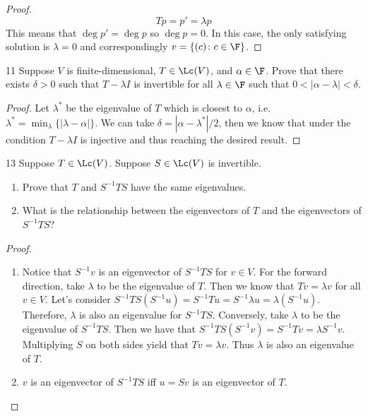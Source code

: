 \documentclass{extarticle}
\begin{document}
\begin{proof}
\[Tp = p' = \lambda p\]
This means that \(\deg p' = \deg p\) so \(\deg p = 0\). In this case, the only satisfying 
solution is \(\lambda = 0\) and correspondingly \(v = \{(c) \colon c \in \F\}\).
\end{proof}

\begin{problem}{11}
    Suppose \(V\) is finite-dimensional, \(T \in \Lc(V)\), and \(\alpha \in \F\). Prove that 
    there exists \(\delta > 0\) such that \(T - \lambda I\) is invertible for all \(\lambda \in \F\)
    such that \(0 < |\alpha - \lambda| < \delta\).
\end{problem}

\begin{proof}
Let \(\lambda^*\) be the eigenvalue of \(T\) which is closest to \(\alpha\), i.e. \(\lambda^* = \min_\lambda\{
    |\lambda - \alpha|\}\). We can take \(\delta = |\alpha - \lambda^*|/2\), then we know that 
    under the condition \(T - \lambda I\) is injective and thus reaching the desired result. 
\end{proof}

\begin{problem}{13}
    Suppose \(T \in \Lc(V)\). Suppose \(S \in \Lc(V)\) is invertible. 
    \begin{enumerate}[label=(\alph*)]
        \item Prove that \(T\) and \(S^{-1}TS\) have the same eigenvalues. 
        \item What is the relationship between the eigenvectors of \(T\) and the eigenvectors of \(S^{-1}TS\)?
    \end{enumerate}
\end{problem}

\begin{proof}
\begin{enumerate}[label=(\alph*)]
    \item Notice that \(S^{-1}v\) is an eigenvector of \(S^{-1}TS\) for \(v \in V\). For the
    forward direction, take \(\lambda\) to be the eigenvalue of \(T\). Then we know that \(Tv = 
    \lambda v\) for all \(v \in V\). Let's consider \(S^{-1}TS (S^{-1}u) = S^{-1}Tu = S^{-1} \lambda u 
    = \lambda (S^{-1} u)\). Therefore, \(\lambda\) is also an eigenvalue for \(S^{-1}TS\). 
    Conversely, take \(\lambda\) to be the eigenvalue of \(S^{-1}TS\). Then we have that 
    \(S^{-1}TS (S^{-1}v) = S^{-1}Tv = \lambda S^{-1}v\). Multiplying \(S\) on both sides yield 
    that \(Tv = \lambda v\). Thus \(\lambda\) is also an eigenvalue of \(T\). 
    
    \item  \(v\) is an eigenvector of \(S^{-1}TS\) iff \(u = Sv\) is an eigenvector of \(T\).
\end{enumerate}
\end{proof}
\end{document}
